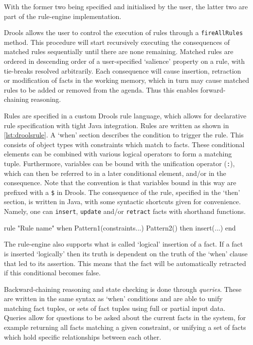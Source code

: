 With the former two being specified and initialised by the user, the latter two
are part of the rule-engine implementation.

Drools allows the user to control the execution of rules through a \texttt{fireAllRules} method.
This procedure will start recursively executing the consequences of matched
rules sequentially until there are none remaining. 
Matched rules are ordered in descending order of a user-specified `salience' property on a rule, with tie-breaks resolved arbitrarily.
Each consequence will cause insertion,
retraction or modification of facts in the working memory, which in turn may
cause matched rules to be added or removed from the agenda. Thus this enables
forward-chaining reasoning.

Rules are specified in a custom Drools rule language, which allows for
declarative rule specification with tight Java integration. Rules are written as
shown in \autoref{lst:droolsrule}. A `when' section describes the condition
to trigger the rule. This consists of object types with constraints which match
to facts. These conditional elements can be combined with various logical
operators to form a matching tuple. Furthermore, variables can be bound with the
unification operator (\texttt{:}), which can then be referred to in a later
conditional element, and/or in the consequence. Note that the convention is that variables bound in this way are prefixed with a \texttt{\$} in Drools.
The consequence of the rule,
specified in the `then' section, is written in Java, with some syntactic
shortcuts given for convenience. Namely, one can \texttt{insert}, \texttt{update}
and/or \texttt{retract} facts with shorthand functions.

\begin{drools}[label=lst:droolsrule,caption=Syntax of a Drools rule.]
rule "Rule name"
when
	Pattern1(constraints...)
	Pattern2()
then
	insert(...)
end
\end{drools}

The rule-engine also supports what is called `logical' insertion of a fact. If a
fact is inserted `logically' then its truth is dependent on the truth of the
`when' clause that led to its assertion. This means that the fact will be
automatically retracted if this conditional becomes false.

Backward-chaining reasoning and state checking is done through \emph{queries}.
These are written in the same syntax as `when' conditions and are able to
unify matching fact tuples, or sets of fact tuples using full or partial input
data. Queries allow for questions to be asked about the current facts in the
system, for example returning all facts matching a given constraint, or
unifying a set of facts which hold specific relationships between each other.

